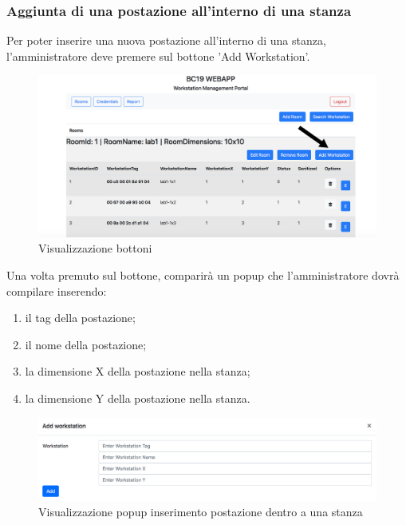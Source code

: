 \subsubsection{Aggiunta di una postazione all'interno di una stanza}
Per poter inserire una nuova postazione all'interno di una stanza, l'amministratore deve premere sul bottone 'Add Workstation'.
\begin{figure}[H]
	\centering
	\includegraphics[width=15cm]{res/images/bottoneAddWorkstation.png}
	\caption{Visualizzazione bottoni}
\end{figure}
Una volta premuto sul bottone, comparirà un popup che l'amministratore dovrà compilare inserendo:
\begin{enumerate}
	\item il tag della postazione;
	\item il nome della postazione;
	\item la dimensione X della postazione nella stanza;
	\item la dimensione Y della postazione nella stanza.
\end{enumerate}
\begin{figure}[H]
	\centering
	\includegraphics[width=15cm]{res/images/addWorkstation.png}
	\caption{Visualizzazione popup inserimento postazione dentro a una stanza}
\end{figure}

